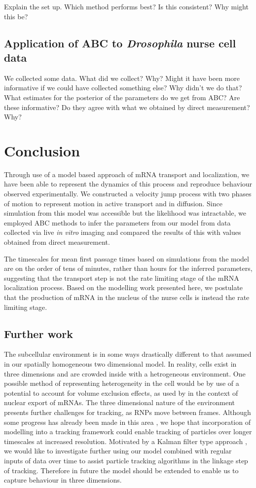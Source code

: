 \documentclass[twocolumn]{biophys}
\begin{document}
Explain the set up.
Which method performs best? Is this consistent?
Why might this be?

\subsection{Application of ABC to \textit{Drosophila} nurse cell data}
We collected some data.
What did we collect? Why? Might it have been more informative if we could have collected something else?
Why didn't we do that?
What estimates for the posterior of the parameters do we get from ABC?
Are these informative?
Do they agree with what we obtained by direct measurement? Why?

\section{Conclusion}
Through use of a model based approach of mRNA transport and localization, we have been able to represent the dynamics of this process and reproduce behaviour observed experimentally.
We constructed a velocity jump process with two phases of motion to represent motion in active transport and in diffusion.
Since simulation from this model was accessible but the likelihood was intractable, we employed ABC methods to infer the parameters from our model from data collected via live \textit{in vitro} imaging and compared the results of this with values obtained from direct measurement.

The timescales for mean first passage times based on simulations from the model are on the order of tens of minutes, rather than hours for the inferred parameters, suggesting that the transport step is not the rate limiting stage of the mRNA localization process.
Based on the modelling work presented here, we postulate that the production of mRNA in the nucleus of the nurse cells is instead the rate limiting stage.

\subsection{Further work}
The subcellular environment is in some ways drastically different to that assumed in our spatially homogeneous two dimensional model.
In reality, cells exist in three dimensions and are crowded inside with a hetrogeneous environment. 
One possible method of representing heterogeneity in the cell would be by use of a potential to account for volume exclusion effects, as used by \citet{isaacson2011influence} in the context of nuclear export of mRNAs.
The three dimensional nature of the environment presents further challenges for tracking, as RNPs move between frames.
Although some progress has already been made in this area \citep{thompson2010three}, we hope that incorporation of modelling into a tracking framework could enable tracking of particles over longer timescales at increased resolution. 
Motivated by a Kalman filter type approach \citep{faragher2012understanding}, we would like to investigate further using our model combined with regular inputs of data over time to assist particle tracking algorithms in the linkage step of tracking.
Therefore in future the model should be extended to enable us to capture behaviour in three dimensions. 
\end{document}
